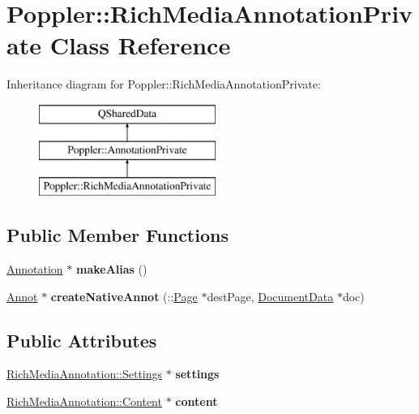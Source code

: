 \hypertarget{class_poppler_1_1_rich_media_annotation_private}{}\section{Poppler\+:\+:Rich\+Media\+Annotation\+Private Class Reference}
\label{class_poppler_1_1_rich_media_annotation_private}
Inheritance diagram for Poppler\+:\+:Rich\+Media\+Annotation\+Private\+:\begin{figure}[H]
\begin{center}
\leavevmode
\includegraphics[height=3.000000cm]{class_poppler_1_1_rich_media_annotation_private}
\end{center}
\end{figure}
\subsection*{Public Member Functions}
\begin{DoxyCompactItemize}
\item 
\mbox{\label{class_poppler_1_1_rich_media_annotation_private_aef7391f905374d3fa2897cbd906b6ccc}} 
\hyperlink{class_poppler_1_1_annotation}{Annotation} $\ast$ {\bfseries make\+Alias} ()
\item 
\mbox{\label{class_poppler_1_1_rich_media_annotation_private_a2476543c2a50a0abe58def3cc67a36ea}} 
\hyperlink{class_annot}{Annot} $\ast$ {\bfseries create\+Native\+Annot} (\+::\hyperlink{class_poppler_1_1_page}{Page} $\ast$dest\+Page, \hyperlink{class_poppler_1_1_document_data}{Document\+Data} $\ast$doc)
\end{DoxyCompactItemize}
\subsection*{Public Attributes}
\begin{DoxyCompactItemize}
\item 
\mbox{\label{class_poppler_1_1_rich_media_annotation_private_aabb5c63c5578fbf05539b3cecbc21db8}} 
\hyperlink{class_poppler_1_1_rich_media_annotation_1_1_settings}{Rich\+Media\+Annotation\+::\+Settings} $\ast$ {\bfseries settings}
\item 
\mbox{\label{class_poppler_1_1_rich_media_annotation_private_a6f82fcafcec9036d4935b546590f954c}} 
\hyperlink{class_poppler_1_1_rich_media_annotation_1_1_content}{Rich\+Media\+Annotation\+::\+Content} $\ast$ {\bfseries content}
\end{DoxyCompactItemize}
